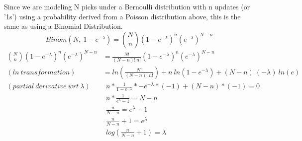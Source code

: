 Since we are modeling N picks under a Bernoulli distribution with n updates (or '1s') using a probability derived from a Poisson distribution above, this is the same as using a Binomial Distribution.
$$Binom(N, ~1 - e^{-\lambda}) = {N \choose n} (1 - e^{-\lambda})^{n} (e^{-\lambda})^{N-n}$$
\begin{align*}
	{N \choose n} (1 - e^{-\lambda})^{n} (e^{-\lambda})^{N-n} &= \frac{N!}{(N - n)! ~n!} (1 - e^{-\lambda})^{n} (e^{-\lambda})^{N-n} \\ (ln ~transformation)
	&= ln(\frac{N!}{(N - n)! ~n!}) + n~ln(1 - e^{-\lambda}) + (N-n)~(-\lambda) ~ln(e) \\ (partial~derivative~wrt~\lambda)
	&~~ n * \frac{1}{1-e^{-\lambda}} * -e^{-\lambda} * (-1) + (N-n) * (-1) = 0 \\
	&~~ n * \frac{1}{e^{\lambda} - 1} = N-n \\
	&~~ \frac{n}{N-n} = e^{\lambda} - 1 \\
	&~~ \frac{n}{N-n} + 1 = e^{\lambda} \\
	&~~ log(\frac{n}{N-n} + 1) = \lambda \\
\end{align*}